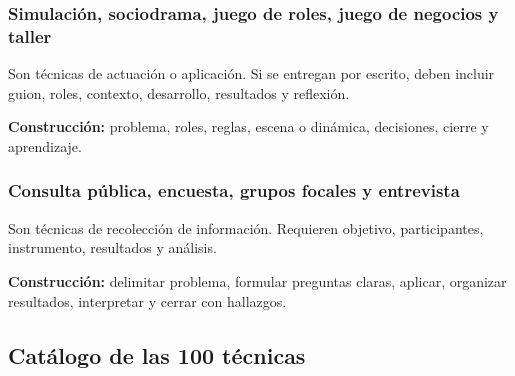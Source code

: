 \subsubsection*{Simulación, sociodrama, juego de roles, juego de negocios y taller}

Son técnicas de actuación o aplicación. Si se entregan por escrito, deben incluir guion, roles, contexto, desarrollo, resultados y reflexión.

\textbf{Construcción:} problema, roles, reglas, escena o dinámica, decisiones, cierre y aprendizaje.

\subsubsection*{Consulta pública, encuesta, grupos focales y entrevista}

Son técnicas de recolección de información. Requieren objetivo, participantes, instrumento, resultados y análisis.

\textbf{Construcción:} delimitar problema, formular preguntas claras, aplicar, organizar resultados, interpretar y cerrar con hallazgos.

\subsection{Catálogo de las 100 técnicas}

